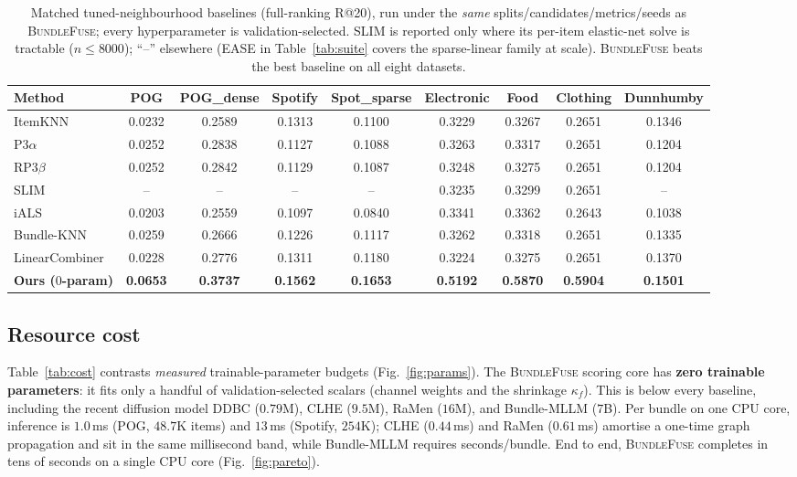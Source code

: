 \begin{table}[t]\centering\small
\caption{Matched tuned-neighbourhood baselines (full-ranking R@20), run under the \emph{same} splits/candidates/metrics/seeds
as \textsc{BundleFuse}; every hyperparameter is validation-selected. SLIM is reported only where its per-item elastic-net
solve is tractable ($n\le 8000$); ``--'' elsewhere (EASE in Table~\ref{tab:suite} covers the sparse-linear family at scale).
\textsc{BundleFuse} beats the best baseline on all eight datasets.}
\label{tab:neigh}
\setlength{\tabcolsep}{4.5pt}
\begin{tabular}{lcccccccc}
\toprule
Method & POG & POG\_dense & Spotify & Spot\_sparse & Electronic & Food & Clothing & Dunnhumby \\
\midrule
ItemKNN        & 0.0232 & 0.2589 & 0.1313 & 0.1100 & 0.3229 & 0.3267 & 0.2651 & 0.1346 \\
P3$\alpha$     & 0.0252 & 0.2838 & 0.1127 & 0.1088 & 0.3263 & 0.3317 & 0.2651 & 0.1204 \\
RP3$\beta$     & 0.0252 & 0.2842 & 0.1129 & 0.1087 & 0.3248 & 0.3275 & 0.2651 & 0.1204 \\
SLIM           & --     & --     & --     & --     & 0.3235 & 0.3299 & 0.2651 & --     \\
iALS           & 0.0203 & 0.2559 & 0.1097 & 0.0840 & 0.3341 & 0.3362 & 0.2643 & 0.1038 \\
Bundle-KNN     & 0.0259 & 0.2666 & 0.1226 & 0.1117 & 0.3262 & 0.3318 & 0.2651 & 0.1335 \\
LinearCombiner & 0.0228 & 0.2776 & 0.1311 & 0.1180 & 0.3224 & 0.3275 & 0.2651 & 0.1370 \\
\midrule
\textbf{Ours ($0$-param)} & \textbf{0.0653} & \textbf{0.3737} & \textbf{0.1562} & \textbf{0.1653} & \textbf{0.5192} & \textbf{0.5870} & \textbf{0.5904} & \textbf{0.1501} \\
\bottomrule
\end{tabular}
\end{table}

\subsection{Resource cost}
\label{sec:cost}
Table~\ref{tab:cost} contrasts \emph{measured} trainable-parameter budgets (Fig.~\ref{fig:params}). The
\textsc{BundleFuse} scoring core has \textbf{zero trainable parameters}: it fits only a handful of validation-selected
scalars (channel weights and the shrinkage $\kappa_f$). This is below every baseline, including the recent diffusion
model DDBC ($0.79$M), CLHE ($9.5$M), RaMen ($16$M), and Bundle-MLLM ($7$B). Per bundle on one CPU core, inference is
$1.0$\,ms (POG, $48.7$K items) and $13$\,ms (Spotify, $254$K); CLHE ($0.44$\,ms) and RaMen ($0.61$\,ms) amortise a
one-time graph propagation and sit in the same millisecond band, while Bundle-MLLM requires seconds/bundle. End to
end, \textsc{BundleFuse} completes in tens of seconds on a single CPU core (Fig.~\ref{fig:pareto}).

